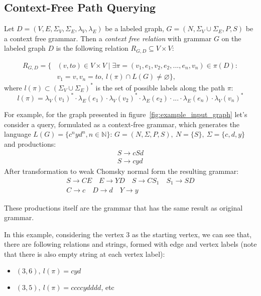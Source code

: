 \subsection{Context-Free Path Querying}


\begin{definition}
Let $D = (V, E, \Sigma_V, \Sigma_E, \lambda_V, \lambda_E)$ be a labeled graph, $G = (N, \Sigma_V \cup \Sigma_E, P, S)$ be a context free grammar. Then a \emph{context free relation} with grammar $G$ on the labeled graph $D$ is the following relation $R_{G, D} \subseteq V \times V$:

\begin{equation*} \label{eq1}
\begin{split}
R_{G, D} = \{&(v, to) \in V \times V \mid \exists \pi = (v_1, e_1, v_2, e_2, ..., e_n, v_n) \in \pi(D): \\
      &v_1 = v, v_n = to,~l(\pi) \cap L(G) \neq \varnothing \},
\end{split}
\end{equation*}
where $l(\pi) \subset (\Sigma_V \cup \Sigma_E)^*$ is the set of possible labels along the path $\pi$:
$$l(\pi) = \lambda_V(v_1)^* \cdot \lambda_E(e_1) \cdot \lambda_V(v_2)^* \cdot \lambda_E(e_2) \cdot ... \cdot \lambda_E(e_n) \cdot \lambda_V(v_n)^*$$

For example, for the graph presented in figure~\ref{fig:example_input_graph} let's consider a query, formulated as a context-free grammar, which generates the language $L(G) = \{c^nyd^n, n \in \mathbb{N}\}$:
$G=(N, \Sigma, P, S), ~N=\{S\},~\Sigma=\{c, d, y\}$ and productions: 
\begin{align*}
S \rightarrow cSd\\
S \rightarrow cyd
\end{align*}
After transformation to weak Chomsky normal form the resulting grammar:
\begin{gather*}
S \rightarrow CE \quad E \rightarrow YD  \quad S \rightarrow CS_1 \quad S_1 \rightarrow SD \\
C \rightarrow c \quad D \rightarrow d \quad Y \rightarrow y
\end{gather*}

These productions itself are the grammar that has the same result as original grammar.

In this example, considering the vertex 3 as the starting vertex, we can see that, there are following relations and strings, formed with edge and vertex labels (note that there is also empty string at each vertex label):
\begin{itemize}
    \item $(3,6),~l(\pi) = cyd$ 
    \item $(3,5),~l(\pi) = ccccydddd$,  etc
\end{itemize}

\end{definition}

